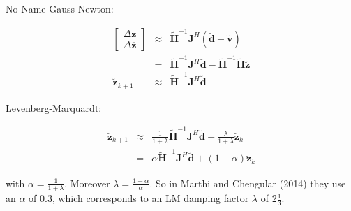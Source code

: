 \documentclass[a4paper,10pt]{article}
\newcommand{\conj}[1]{\overline{#1}}
\begin{document}
\begin{section}{No Name}
Gauss-Newton:

\begin{eqnarray}
\begin{bmatrix} \Delta \boldsymbol{z}\\ \Delta \conj{\boldsymbol{z}} \end{bmatrix} &\approx& \widetilde{\boldsymbol{H}}^{-1}\boldsymbol{J}^H(\breve{\boldsymbol{d}}-\breve{\boldsymbol{v}})\\ 
&=& \widetilde{\boldsymbol{H}}^{-1}\boldsymbol{J}^H\breve{\boldsymbol{d}} -  \widetilde{\boldsymbol{H}}^{-1}\widetilde{\boldsymbol{H}}\breve{\boldsymbol{z}}\\
\breve{\boldsymbol{z}}_{k+1} &\approx& \widetilde{\boldsymbol{H}}^{-1}\boldsymbol{J}^H\breve{\boldsymbol{d}}
\end{eqnarray}

Levenberg-Marquardt:

\begin{eqnarray}
\breve{\boldsymbol{z}}_{k+1} &\approx& \frac{1}{1+\lambda}\widetilde{\boldsymbol{H}}^{-1}\boldsymbol{J}^H\breve{\boldsymbol{d}} + \frac{\lambda}{1+\lambda} \breve{\boldsymbol{z}}_k\\
 &=& \alpha \widetilde{\boldsymbol{H}}^{-1}\boldsymbol{J}^H\breve{\boldsymbol{d}} + (1-\alpha)\breve{\boldsymbol{z}}_k 
\end{eqnarray}

with $\alpha = \frac{1}{1+\lambda}$. Moreover $\lambda = \frac{1-\alpha}{\alpha}$. So in Marthi and Chengular (2014) they use an $\alpha$ of 0.3, which corresponds to an LM damping factor $\lambda$
of $2\frac{1}{3}$.




\end{section}
\end{document}
